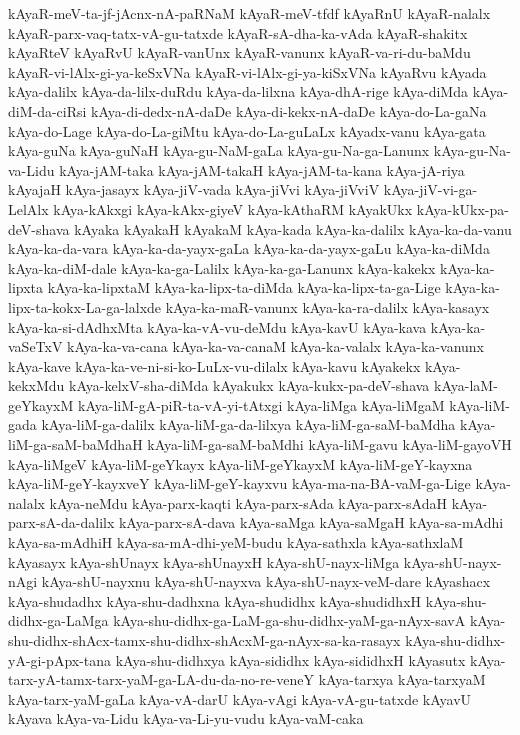 {kAyaR-meV-ta-jf-jAcnx-nA-paRNaM
kAyaR-meV-tfdf
kAyaRnU
kAyaR-nalalx
kAyaR-parx-vaq-tatx-vA-gu-tatxde
kAyaR-sA-dha-ka-vAda
kAyaR-shakitx
kAyaRteV
kAyaRvU
kAyaR-vanUnx
kAyaR-vanunx
kAyaR-va-ri-du-baMdu
kAyaR-vi-lAlx-gi-ya-keSxVNa
kAyaR-vi-lAlx-gi-ya-kiSxVNa
kAyaRvu
kAyada
kAya-dalilx
kAya-da-lilx-duRdu
kAya-da-lilxna
kAya-dhA-rige
kAya-diMda
kAya-diM-da-ciRsi
kAya-di-dedx-nA-daDe
kAya-di-kekx-nA-daDe
kAya-do-La-gaNa
kAya-do-Lage
kAya-do-La-giMtu
kAya-do-La-guLaLx
kAyadx-vanu
kAya-gata
kAya-guNa
kAya-guNaH
kAya-gu-NaM-gaLa
kAya-gu-Na-ga-Lanunx
kAya-gu-Na-va-Lidu
kAya-jAM-taka
kAya-jAM-takaH
kAya-jAM-ta-kana
kAya-jA-riya
kAyajaH
kAya-jasayx
kAya-jiV-vada
kAya-jiVvi
kAya-jiVviV
kAya-jiV-vi-ga-LelAlx
kAya-kAkxgi
kAya-kAkx-giyeV
kAya-kAthaRM
kAyakUkx
kAya-kUkx-pa-deV-shava
kAyaka
kAyakaH
kAyakaM
kAya-kada
kAya-ka-dalilx
kAya-ka-da-vanu
kAya-ka-da-vara
kAya-ka-da-yayx-gaLa
kAya-ka-da-yayx-gaLu
kAya-ka-diMda
kAya-ka-diM-dale
kAya-ka-ga-Lalilx
kAya-ka-ga-Lanunx
kAya-kakekx
kAya-ka-lipxta
kAya-ka-lipxtaM
kAya-ka-lipx-ta-diMda
kAya-ka-lipx-ta-ga-Lige
kAya-ka-lipx-ta-kokx-La-ga-lalxde
kAya-ka-maR-vanunx
kAya-ka-ra-dalilx
kAya-kasayx
kAya-ka-si-dAdhxMta
kAya-ka-vA-vu-deMdu
kAya-kavU
kAya-kava
kAya-ka-vaSeTxV
kAya-ka-va-cana
kAya-ka-va-canaM
kAya-ka-valalx
kAya-ka-vanunx
kAya-kave
kAya-ka-ve-ni-si-ko-LuLx-vu-dilalx
kAya-kavu
kAyakekx
kAya-kekxMdu
kAya-kelxV-sha-diMda
kAyakukx
kAya-kukx-pa-deV-shava
kAya-laM-geYkayxM
kAya-liM-gA-piR-ta-vA-yi-tAtxgi
kAya-liMga
kAya-liMgaM
kAya-liM-gada
kAya-liM-ga-dalilx
kAya-liM-ga-da-lilxya
kAya-liM-ga-saM-baMdha
kAya-liM-ga-saM-baMdhaH
kAya-liM-ga-saM-baMdhi
kAya-liM-gavu
kAya-liM-gayoVH
kAya-liMgeV
kAya-liM-geYkayx
kAya-liM-geYkayxM
kAya-liM-geY-kayxna
kAya-liM-geY-kayxveY
kAya-liM-geY-kayxvu
kAya-ma-na-BA-vaM-ga-Lige
kAya-nalalx
kAya-neMdu
kAya-parx-kaqti
kAya-parx-sAda
kAya-parx-sAdaH
kAya-parx-sA-da-dalilx
kAya-parx-sA-dava
kAya-saMga
kAya-saMgaH
kAya-sa-mAdhi
kAya-sa-mAdhiH
kAya-sa-mA-dhi-yeM-budu
kAya-sathxla
kAya-sathxlaM
kAyasayx
kAya-shUnayx
kAya-shUnayxH
kAya-shU-nayx-liMga
kAya-shU-nayx-nAgi
kAya-shU-nayxnu
kAya-shU-nayxva
kAya-shU-nayx-veM-dare
kAyashacx
kAya-shudadhx
kAya-shu-dadhxna
kAya-shudidhx
kAya-shudidhxH
kAya-shu-didhx-ga-LaMga
kAya-shu-didhx-ga-LaM-ga-shu-didhx-yaM-ga-nAyx-savA
kAya-shu-didhx-shAcx-tamx-shu-didhx-shAcxM-ga-nAyx-sa-ka-rasayx
kAya-shu-didhx-yA-gi-pApx-tana
kAya-shu-didhxya
kAya-sididhx
kAya-sididhxH
kAyasutx
kAya-tarx-yA-tamx-tarx-yaM-ga-LA-du-da-no-re-veneY
kAya-tarxya
kAya-tarxyaM
kAya-tarx-yaM-gaLa
kAya-vA-darU
kAya-vAgi
kAya-vA-gu-tatxde
kAyavU
kAyava
kAya-va-Lidu
kAya-va-Li-yu-vudu
kAya-vaM-caka
}
